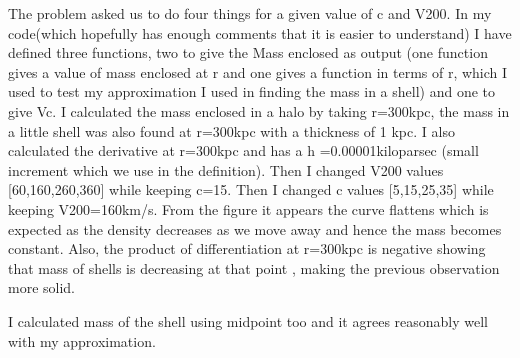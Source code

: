 \documentclass{article}
\begin{document}
The problem asked us to do four things for a given value of c and V200. In my code(which hopefully has enough comments that it is easier to understand) I have defined three functions, two to give the Mass enclosed as output (one function gives a value of mass enclosed at r and one gives a function in terms of r, which I used to test my approximation I used  in finding the mass in a shell) and one to give Vc. I calculated the mass enclosed in a halo by taking r=300kpc, the mass in a little shell was also found at r=300kpc with a thickness of 1 kpc. I also calculated the derivative at r=300kpc and has a h =0.00001kiloparsec (small increment which we use in the definition). Then I changed V200 values [60,160,260,360] while keeping c=15. Then I changed c values [5,15,25,35] while keeping V200=160km/s. From the figure it appears the curve flattens which is expected as the density decreases as we move away and hence the mass becomes constant. Also, the product of differentiation at r=300kpc is negative showing that mass of shells is decreasing at that point , making the previous observation more solid.
\vspace{0.2em}

I calculated mass of the shell using midpoint too and it agrees reasonably well with my approximation. 
\end{document}
